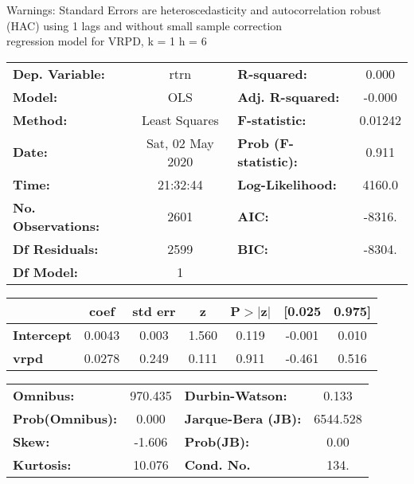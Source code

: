 Warnings: \newline
 [1] Standard Errors are heteroscedasticity and autocorrelation robust (HAC) using 1 lags and without small sample correction\\ 

regression model for VRPD, k = 1 h = 6\begin{center}
\begin{tabular}{lclc}
\toprule
\textbf{Dep. Variable:}    &       rtrn       & \textbf{  R-squared:         } &     0.000   \\
\textbf{Model:}            &       OLS        & \textbf{  Adj. R-squared:    } &    -0.000   \\
\textbf{Method:}           &  Least Squares   & \textbf{  F-statistic:       } &   0.01242   \\
\textbf{Date:}             & Sat, 02 May 2020 & \textbf{  Prob (F-statistic):} &    0.911    \\
\textbf{Time:}             &     21:32:44     & \textbf{  Log-Likelihood:    } &    4160.0   \\
\textbf{No. Observations:} &        2601      & \textbf{  AIC:               } &    -8316.   \\
\textbf{Df Residuals:}     &        2599      & \textbf{  BIC:               } &    -8304.   \\
\textbf{Df Model:}         &           1      & \textbf{                     } &             \\
\bottomrule
\end{tabular}
\begin{tabular}{lcccccc}
                   & \textbf{coef} & \textbf{std err} & \textbf{z} & \textbf{P$> |$z$|$} & \textbf{[0.025} & \textbf{0.975]}  \\
\midrule
\textbf{Intercept} &       0.0043  &        0.003     &     1.560  &         0.119        &       -0.001    &        0.010     \\
\textbf{vrpd}      &       0.0278  &        0.249     &     0.111  &         0.911        &       -0.461    &        0.516     \\
\bottomrule
\end{tabular}
\begin{tabular}{lclc}
\textbf{Omnibus:}       & 970.435 & \textbf{  Durbin-Watson:     } &    0.133  \\
\textbf{Prob(Omnibus):} &   0.000 & \textbf{  Jarque-Bera (JB):  } & 6544.528  \\
\textbf{Skew:}          &  -1.606 & \textbf{  Prob(JB):          } &     0.00  \\
\textbf{Kurtosis:}      &  10.076 & \textbf{  Cond. No.          } &     134.  \\
\bottomrule
\end{tabular}
\end{center}

